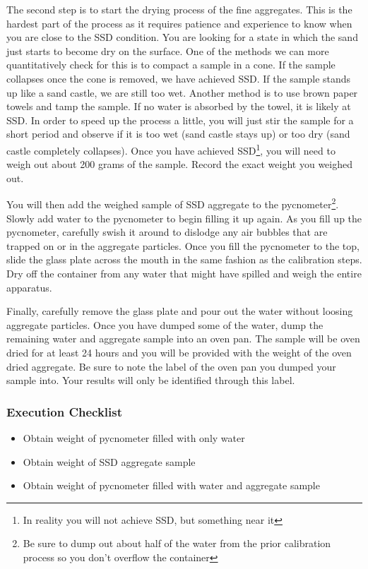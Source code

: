 \documentclass[12pt]{article}
\begin{document}
The second step is to start the drying process of the fine aggregates. This is the hardest part of the process as it requires patience and experience to know when you are close to the SSD condition. You are looking for a state in which the sand just starts to become dry on the surface. One of the methods we can more quantitatively check for this is to compact a sample in a cone. If the sample collapses once the cone is removed, we have achieved SSD. If the sample stands up like a sand castle, we are still too wet. Another method is to use brown paper towels and tamp the sample. If no water is absorbed by the towel, it is likely at SSD. In order to speed up the process a little, you will just stir the sample for a short period and observe if it is too wet (sand castle stays up) or too dry (sand castle completely collapses). Once you have achieved SSD\footnote{In reality you will not achieve SSD, but something near it}, you will need to weigh out about 200 grams of the sample. Record the exact weight you weighed out.

You will then add the weighed sample of SSD aggregate to the pycnometer\footnote{Be sure to dump out about half of the water from the prior calibration process so you don't overflow the container}. Slowly add water to the pycnometer to begin filling it up again. As you fill up the pycnometer, carefully swish it around to dislodge any air bubbles that are trapped on or in the aggregate particles. Once you fill the pycnometer to the top, slide the glass plate across the mouth in the same fashion as the calibration steps. Dry off the container from any water that might have spilled and weigh the entire apparatus.

Finally, carefully remove the glass plate and pour out the water without loosing aggregate particles. Once you have dumped some of the water, dump the remaining water and aggregate sample into an oven pan. The sample will be oven dried for at least 24 hours and you will be provided with the weight of the oven dried aggregate. Be sure to note the label of the oven pan you dumped your sample into. Your results will only be identified through this label.

\subsubsection*{Execution Checklist}
\begin{itemize}
    \item Obtain weight of pycnometer filled with only water
    \item Obtain weight of SSD aggregate sample
    \item Obtain weight of pycnometer filled with water and aggregate sample
\end{itemize}
\end{document}
